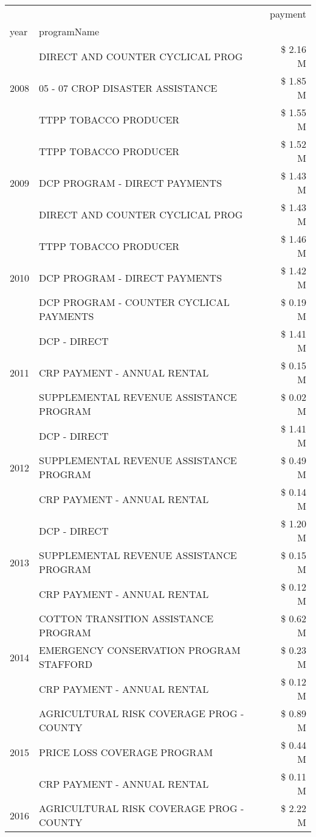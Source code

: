\begin{tabular}{llr}
\toprule
 &  & payment \\
year & programName &  \\
\midrule
\multirow[t]{3}{*}{2008} & DIRECT AND COUNTER CYCLICAL PROG & \$ 2.16 M \\
 & 05 - 07 CROP DISASTER ASSISTANCE & \$ 1.85 M \\
 & TTPP TOBACCO PRODUCER & \$ 1.55 M \\
\cline{1-3}
\multirow[t]{3}{*}{2009} & TTPP TOBACCO PRODUCER & \$ 1.52 M \\
 & DCP PROGRAM - DIRECT PAYMENTS & \$ 1.43 M \\
 & DIRECT AND COUNTER CYCLICAL PROG & \$ 1.43 M \\
\cline{1-3}
\multirow[t]{3}{*}{2010} & TTPP TOBACCO PRODUCER & \$ 1.46 M \\
 & DCP PROGRAM - DIRECT PAYMENTS & \$ 1.42 M \\
 & DCP PROGRAM - COUNTER CYCLICAL PAYMENTS & \$ 0.19 M \\
\cline{1-3}
\multirow[t]{3}{*}{2011} & DCP - DIRECT & \$ 1.41 M \\
 & CRP PAYMENT - ANNUAL RENTAL & \$ 0.15 M \\
 & SUPPLEMENTAL REVENUE ASSISTANCE PROGRAM & \$ 0.02 M \\
\cline{1-3}
\multirow[t]{3}{*}{2012} & DCP - DIRECT & \$ 1.41 M \\
 & SUPPLEMENTAL REVENUE ASSISTANCE PROGRAM & \$ 0.49 M \\
 & CRP PAYMENT - ANNUAL RENTAL & \$ 0.14 M \\
\cline{1-3}
\multirow[t]{3}{*}{2013} & DCP - DIRECT & \$ 1.20 M \\
 & SUPPLEMENTAL REVENUE ASSISTANCE PROGRAM & \$ 0.15 M \\
 & CRP PAYMENT - ANNUAL RENTAL & \$ 0.12 M \\
\cline{1-3}
\multirow[t]{3}{*}{2014} & COTTON TRANSITION ASSISTANCE PROGRAM & \$ 0.62 M \\
 & EMERGENCY CONSERVATION PROGRAM STAFFORD & \$ 0.23 M \\
 & CRP PAYMENT - ANNUAL RENTAL & \$ 0.12 M \\
\cline{1-3}
\multirow[t]{3}{*}{2015} & AGRICULTURAL RISK COVERAGE PROG - COUNTY & \$ 0.89 M \\
 & PRICE LOSS COVERAGE PROGRAM & \$ 0.44 M \\
 & CRP PAYMENT - ANNUAL RENTAL & \$ 0.11 M \\
\cline{1-3}
\multirow[t]{3}{*}{2016} & AGRICULTURAL RISK COVERAGE PROG - COUNTY & \$ 2.22 M \\

\end{tabular}

